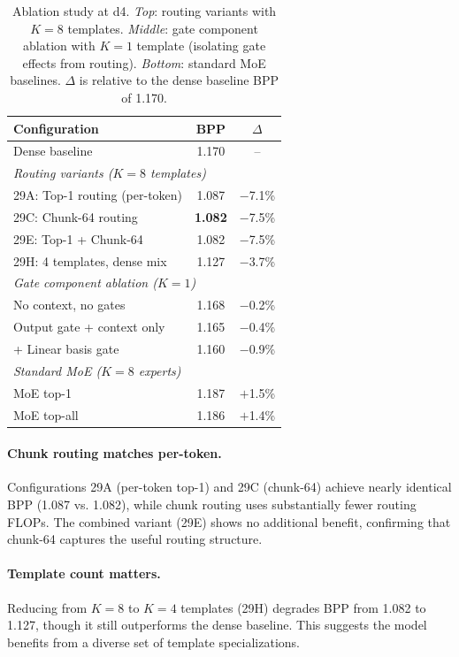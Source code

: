 \documentclass[11pt]{article}
\begin{document}
\begin{table}[t]
\centering
\small
\caption{Ablation study at d4. \emph{Top}: routing variants with $K{=}8$ templates. \emph{Middle}: gate component ablation with $K{=}1$ template (isolating gate effects from routing). \emph{Bottom}: standard MoE baselines. $\Delta$ is relative to the dense baseline BPP of 1.170.}
\label{tab:ablation}
\begin{tabular}{@{}lcc@{}}
\toprule
\textbf{Configuration} & \textbf{BPP} & \textbf{$\Delta$} \\
\midrule
Dense baseline & 1.170 & -- \\
\midrule
\multicolumn{3}{l}{\textit{Routing variants ($K{=}8$ templates)}} \\
\quad 29A: Top-1 routing (per-token) & 1.087 & $-$7.1\% \\
\quad 29C: Chunk-64 routing & \textbf{1.082} & $-$7.5\% \\
\quad 29E: Top-1 + Chunk-64 & 1.082 & $-$7.5\% \\
\quad 29H: 4 templates, dense mix & 1.127 & $-$3.7\% \\
\midrule
\multicolumn{3}{l}{\textit{Gate component ablation ($K{=}1$)}} \\
\quad No context, no gates & 1.168 & $-$0.2\% \\
\quad Output gate + context only & 1.165 & $-$0.4\% \\
\quad + Linear basis gate & 1.160 & $-$0.9\% \\
\midrule
\multicolumn{3}{l}{\textit{Standard MoE ($K{=}8$ experts)}} \\
\quad MoE top-1 & 1.187 & $+$1.5\% \\
\quad MoE top-all & 1.186 & $+$1.4\% \\
\bottomrule
\end{tabular}
\end{table}

\paragraph{Chunk routing matches per-token.} Configurations 29A (per-token top-1) and 29C (chunk-64) achieve nearly identical BPP (1.087 vs. 1.082), while chunk routing uses substantially fewer routing FLOPs. The combined variant (29E) shows no additional benefit, confirming that chunk-64 captures the useful routing structure.

\paragraph{Template count matters.} Reducing from $K{=}8$ to $K{=}4$ templates (29H) degrades BPP from 1.082 to 1.127, though it still outperforms the dense baseline. This suggests the model benefits from a diverse set of template specializations.
\end{document}

